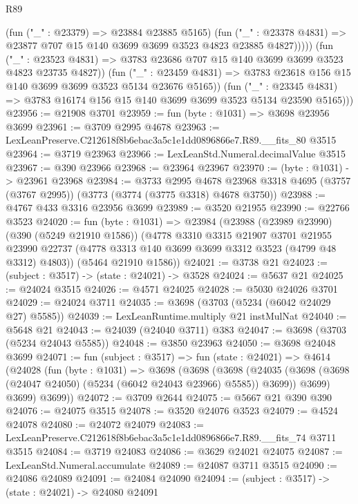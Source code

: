\begin{lexlean}{R89}
\begin{coremodule}
                    (fun ("_" : @23379) => @23884 @23885 @5165)
                    (fun ("_" : @23378 @4831) =>
                    @23877 @707 @15 @140 @3699 @3699 @3523 @4823 @23885 @4827)))))
            (fun ("_" : @23523 @4831) =>
            @3783 @23686 @707 @15 @140 @3699 @3699 @3523 @4823 @23735 @4827))
          (fun ("_" : @23459 @4831) =>
          @3783 @23618 @156 @15 @140 @3699 @3699 @3523 @5134 @23676 @5165))
        (fun ("_" : @23345 @4831) =>
        @3783 @16174 @156 @15 @140 @3699 @3699 @3523 @5134 @23590 @5165)))
@23956 := @21908 @3701
@23959 := fun (byte : @1031) => @3698 @23956 @3699
@23961 := @3709 @2995 @4678
@23963 := LexLeanPreserve.C212618f8b6ebac3a5c1e1dd0896866e7.R89.__fits_80 @3515
@23964 := @3719 @23963
@23966 := LexLeanStd.Numeral.decimalValue @3515
@23967 := @390 @23966
@23968 := @23964 @23967
@23970 := (byte : @1031) -> @23961 @23968
@23984 := @3733
    @2995
    @4678
    @23968
    @3318
    @4695
    (@3757 (@3767 @2995))
    (@3773 (@3774 (@3775 @3318) @4678 @3750))
@23988 := @4767 @433 @3316 @23956 @3699
@23989 := @3520 @21955
@23990 := @22766 @3523
@24020 := fun (byte : @1031) =>
  @23984
    (@23988
      (@23989 @23990)
      (@390 (@5249 @21910 @1586))
      (@4778
        @3310
        @3315
        @21907
        @3701
        @21955
        @23990
        @22737
        (@4778 @3313 @140 @3699 @3699 @3312 @3523 (@4799 @48 @3312) @4803))
      (@5464 @21910 @1586))
@24021 := @3738 @21
@24023 := (subject : @3517) -> (state : @24021) -> @3528
@24024 := @5637 @21
@24025 := @24024 @3515
@24026 := @4571 @24025
@24028 := @5030 @24026 @3701
@24029 := @24024 @3711
@24035 := @3698 (@3703 (@5234 (@6042 @24029 @27) @5585))
@24039 := LexLeanRuntime.multiply @21 instMulNat
@24040 := @5648 @21
@24043 := @24039 (@24040 @3711) @383
@24047 := @3698 (@3703 (@5234 @24043 @5585))
@24048 := @3850 @23963
@24050 := @3698 @24048 @3699
@24071 := fun (subject : @3517) =>
  fun (state : @24021) =>
  @4614
    (@24028
      (fun (byte : @1031) =>
      @3698
        (@3698
          (@3698
            (@24035 (@3698 (@3698 (@24047 @24050) (@5234 (@6042 @24043 @23966) @5585)) @3699))
            @3699)
          @3699)
        @3699))
@24072 := @3709 @2644
@24075 := @5667 @21 @390 @390
@24076 := @24075 @3515
@24078 := @3520 @24076 @3523
@24079 := @4524 @24078
@24080 := @24072 @24079
@24083 := LexLeanPreserve.C212618f8b6ebac3a5c1e1dd0896866e7.R89.__fits_74 @3711 @3515
@24084 := @3719 @24083
@24086 := @3629 @24021 @24075
@24087 := LexLeanStd.Numeral.accumulate
@24089 := @24087 @3711 @3515
@24090 := @24086 @24089
@24091 := @24084 @24090
@24094 := (subject : @3517) -> (state : @24021) -> @24080 @24091

\end{coremodule}
\end{lexlean}
